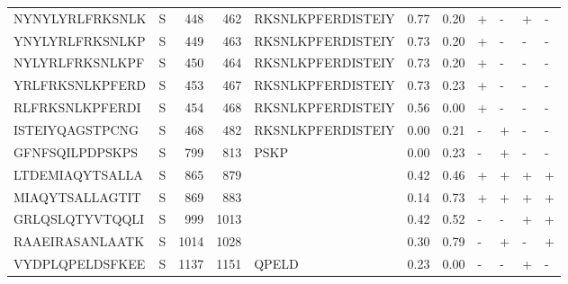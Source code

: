 \begin{tabular}{llrrlrrllll}
NYNYLYRLFRKSNLK &       S &    448 &   462 &  RKSNLKPFERDISTEIY &            0.77 &             0.20 &      + &       - &      + &       - \\
YNYLYRLFRKSNLKP &       S &    449 &   463 &  RKSNLKPFERDISTEIY &            0.73 &             0.20 &      + &       - &      - &       - \\
NYLYRLFRKSNLKPF &       S &    450 &   464 &  RKSNLKPFERDISTEIY &            0.73 &             0.20 &      + &       - &      - &       - \\
YRLFRKSNLKPFERD &       S &    453 &   467 &  RKSNLKPFERDISTEIY &            0.73 &             0.23 &      + &       - &      - &       - \\
RLFRKSNLKPFERDI &       S &    454 &   468 &  RKSNLKPFERDISTEIY &            0.56 &             0.00 &      + &       - &      - &       - \\
ISTEIYQAGSTPCNG &       S &    468 &   482 &  RKSNLKPFERDISTEIY &            0.00 &             0.21 &      - &       + &      - &       - \\
GFNFSQILPDPSKPS &       S &    799 &   813 &               PSKP &            0.00 &             0.23 &      - &       + &      - &       - \\
LTDEMIAQYTSALLA &       S &    865 &   879 &                    &            0.42 &             0.46 &      + &       + &      + &       + \\
MIAQYTSALLAGTIT &       S &    869 &   883 &                    &            0.14 &             0.73 &      + &       + &      + &       + \\
GRLQSLQTYVTQQLI &       S &    999 &  1013 &                    &            0.42 &             0.52 &      - &       - &      + &       + \\
RAAEIRASANLAATK &       S &   1014 &  1028 &                    &            0.30 &             0.79 &      - &       + &      - &       + \\
VYDPLQPELDSFKEE &       S &   1137 &  1151 &              QPELD &            0.23 &             0.00 &      - &       - &      + &       - \\
\bottomrule
\end{tabular}
